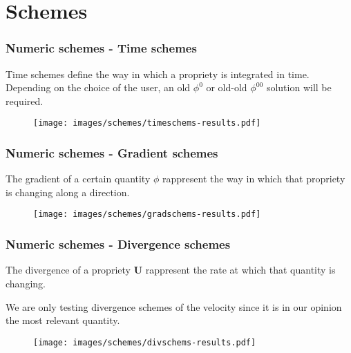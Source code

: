 \documentclass[aspectratio=169]{beamer}
\newcommand{\foam}[1]{{\ttfamily #1}}
\begin{document}
\section{Schemes}
\begin{frame}
\frametitle{Numeric schemes - Time schemes}

Time schemes define the way in which a propriety is integrated in time. 
Depending on the choice of the user, an old $\phi^0$ or old-old $\phi^{00}$ solution will be required.


\begin{figure}[H]
\centering
\texttt{[image: images/schemes/timeschems-results.pdf]}
\end{figure}

\end{frame}


\begin{frame}
\frametitle{Numeric schemes - Gradient schemes}
The gradient of a certain quantity $\phi$ rappresent the way in which that propriety is changing along a direction.


\begin{figure}[H]
\centering
\texttt{[image: images/schemes/gradschems-results.pdf]}
\end{figure}


\end{frame}




\begin{frame}
\frametitle{Numeric schemes - Divergence schemes}
The divergence of a propriety $\bm{U}$ rappresent the rate at which that quantity is changing.

We are only testing divergence schemes of the velocity since it is in our opinion the most relevant quantity.
\vspace{-0.5cm}
\begin{figure}[H]
\centering
\texttt{[image: images/schemes/divschems-results.pdf]}
\end{figure}


\end{frame}
\end{document}
